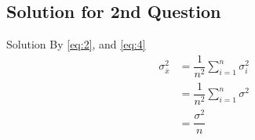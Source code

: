 \documentclass{beamer}
\providecommand{\ovl}[1]{\ensuremath{\overline{#1}}}
\begin{document}
\subsection{Solution for 2nd Question}
\begin{frame}{Solution}
    By \eqref{eq:2}, and \eqref{eq:4}
    \begin{align}
        \sigma^2_{\ovl{x}} &= \dfrac{1}{n^2}\sum^{n}_{i=1}\sigma^2_{i} 
        \\
        &= \dfrac{1}{n^2}\sum^{n}_{i=1} \sigma^2
        \\
        &= \dfrac{\sigma^2}{n}
    \end{align}
\end{frame}
\end{document}
